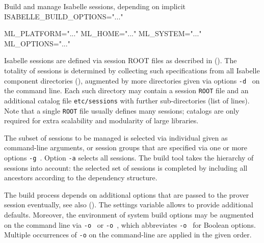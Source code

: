 \begin{isabellebody}
\begin{isamarkuptext}
\begin{ttbox}
  Build and manage Isabelle sessions, depending on implicit
  ISABELLE_BUILD_OPTIONS="..."

  ML_PLATFORM="..."
  ML_HOME="..."
  ML_SYSTEM="..."
  ML_OPTIONS="..."
\end{ttbox}

  \medskip Isabelle sessions are defined via session ROOT files as
  described in ().  The totality of sessions
  is determined by collecting such specifications from all Isabelle
  component directories (), augmented by more
  directories given via options \verb|-d|~ on the
  command line.  Each such directory may contain a session
  \texttt{ROOT} file and an additional catalog file \verb|etc/sessions| with further sub-directories (list of lines).  Note
  that a single \texttt{ROOT} file usually defines many sessions;
  catalogs are only required for extra scalability and modularity
  of large libraries.

  \medskip The subset of sessions to be managed is selected via
  individual  given as command-line arguments, or
  session groups that are specified via one or more options \verb|-g|~.  Option \verb|-a| selects all sessions.
  The build tool takes the hierarchy of sessions into account: the
  selected set of sessions is completed by including all ancestors
  according to the dependency structure.

  \medskip The build process depends on additional options that are
  passed to the prover session eventually, see also
  ().  The settings variable \hyperlink{setting.ISABELLE-BUILD-OPTIONS}{\mbox{}} allows to provide additional defaults.
  Moreover, the environment of system build options may be augmented
  on the command line via \verb|-o|~ or
  \verb|-o|~, which abbreviates \verb|-o|~ for Boolean options.  Multiple occurrences
  of \verb|-o| on the command-line are applied in the given
  order.


\end{isamarkuptext}
\end{isabellebody}
